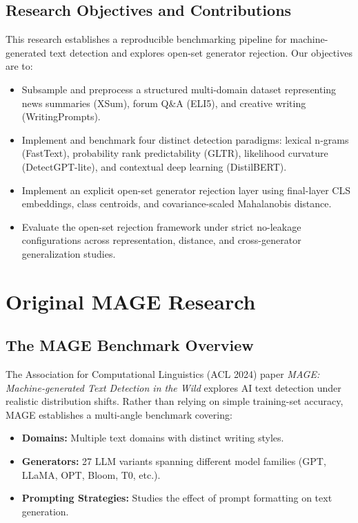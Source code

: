 \documentclass[12pt,a4paper]{report}
\begin{document}
\section{Research Objectives and Contributions}
This research establishes a reproducible benchmarking pipeline for machine-generated text detection and explores open-set generator rejection. Our objectives are to:
\begin{itemize}
    \item Subsample and preprocess a structured multi-domain dataset representing news summaries (XSum), forum Q\&A (ELI5), and creative writing (WritingPrompts).
    \item Implement and benchmark four distinct detection paradigms: lexical n-grams (FastText), probability rank predictability (GLTR), likelihood curvature (DetectGPT-lite), and contextual deep learning (DistilBERT).
    \item Implement an explicit open-set generator rejection layer using final-layer CLS embeddings, class centroids, and covariance-scaled Mahalanobis distance.
    \item Evaluate the open-set rejection framework under strict no-leakage configurations across representation, distance, and cross-generator generalization studies.
\end{itemize}

\chapter{Original MAGE Research}
\label{ch:mage_paper}

\section{The MAGE Benchmark Overview}
The Association for Computational Linguistics (ACL 2024) paper \textit{MAGE: Machine-generated Text Detection in the Wild} \cite{li-etal-2024-mage} explores AI text detection under realistic distribution shifts. Rather than relying on simple training-set accuracy, MAGE establishes a multi-angle benchmark covering:
\begin{itemize}
    \item \textbf{Domains:} Multiple text domains with distinct writing styles.
    \item \textbf{Generators:} 27 LLM variants spanning different model families (GPT, LLaMA, OPT, Bloom, T0, etc.).
    \item \textbf{Prompting Strategies:} Studies the effect of prompt formatting on text generation.
\end{itemize}
\end{document}
